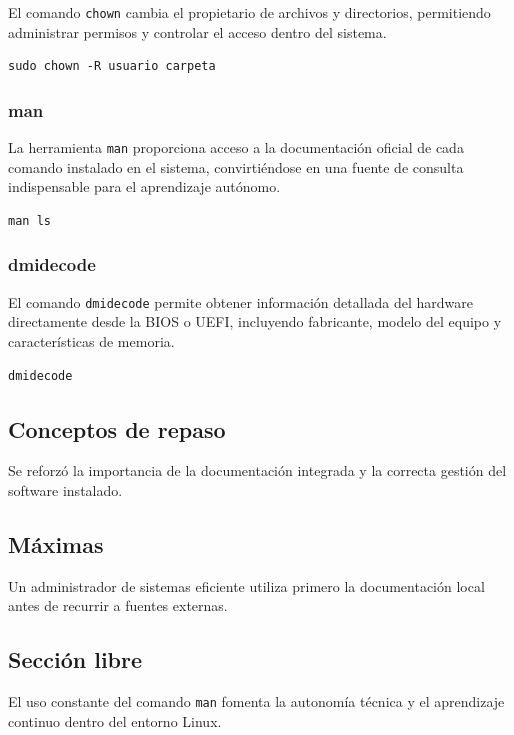 \documentclass[11pt, letterpaper]{article}
\begin{document}
El comando \texttt{chown} cambia el propietario de archivos y directorios,
permitiendo administrar permisos y controlar el acceso dentro del
sistema.

\begin{verbatim}
sudo chown -R usuario carpeta
\end{verbatim}
\subsubsection{man}
\label{sec:orgc14c289}

La herramienta \texttt{man} proporciona acceso a la documentación oficial de
cada comando instalado en el sistema, convirtiéndose en una fuente de
consulta indispensable para el aprendizaje autónomo.

\begin{verbatim}
man ls
\end{verbatim}
\subsubsection{dmidecode}
\label{sec:orgb6cb9de}

El comando \texttt{dmidecode} permite obtener información detallada del
hardware directamente desde la BIOS o UEFI, incluyendo fabricante,
modelo del equipo y características de memoria.

\begin{verbatim}
dmidecode
\end{verbatim}
\subsection{Conceptos de repaso}
\label{sec:org3ad4ae2}

Se reforzó la importancia de la documentación integrada y la correcta
gestión del software instalado.
\subsection{Máximas}
\label{sec:org254ca46}

Un administrador de sistemas eficiente utiliza primero la documentación
local antes de recurrir a fuentes externas.
\subsection{Sección libre}
\label{sec:org216efa4}

El uso constante del comando \texttt{man} fomenta la autonomía técnica y el
aprendizaje continuo dentro del entorno Linux.
\end{document}
